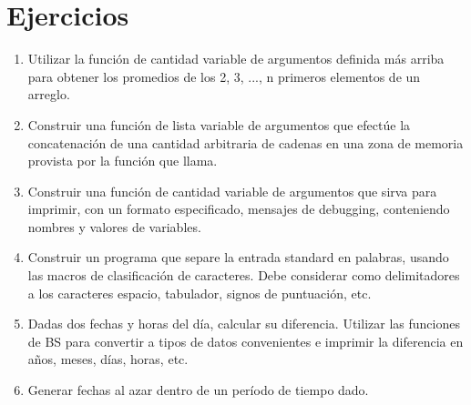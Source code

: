 \section{Ejercicios}
\begin{enumerate}
	\item Utilizar la función de cantidad variable de argumentos definida más arriba
para obtener los promedios de los 2, 3, ..., n primeros elementos de un
arreglo.
	\item Construir una función de lista variable de argumentos que efectúe la
concatenación de una cantidad arbitraria de cadenas en una zona de memoria
provista por la función que llama.
	\item Construir una función de cantidad variable de argumentos que sirva para
imprimir, con un formato especificado, mensajes de debugging, conteniendo
nombres y valores de variables.
	\item Construir un programa que separe la entrada standard en palabras, usando las
macros de clasificación de caracteres. Debe considerar como delimitadores a los
caracteres espacio, tabulador, signos de puntuación, etc.
	\item Dadas dos fechas y horas del día, calcular su diferencia. Utilizar las
funciones de BS para convertir a tipos de datos convenientes e imprimir la
diferencia en años, meses, días, horas, etc.
	\item Generar fechas al azar dentro de un período de tiempo dado.
\end{enumerate}
